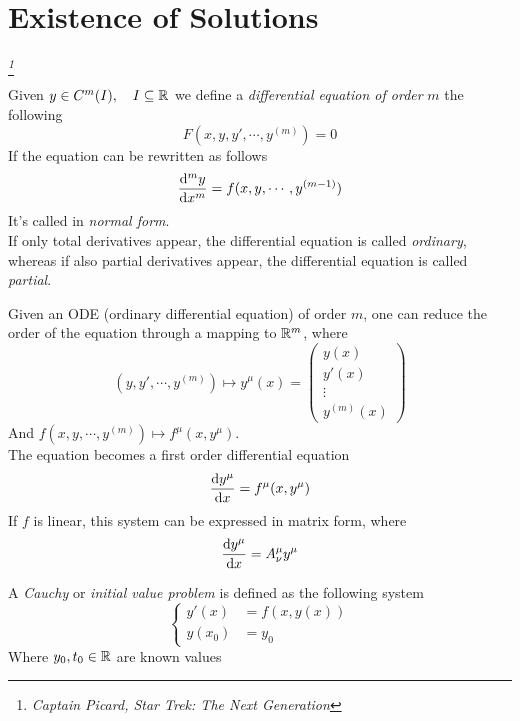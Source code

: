 \documentclass[../complete.tex]{subfiles}
\begin{document}
\section{Existence of Solutions}
\textit{\scalebox{0.7}{\bfseries You might test that assumption at your convenience}\footnote{\textit{Captain Picard, Star Trek: The Next Generation}}}
\baselineskip
\begin{dfn}
	Given $y\in C^m(I),\quad I\subseteq\mathbb{R}$ we define a \textit{differential equation of order} $m$ the following
	\begin{equation*}
		F(x,y,y',\cdots,y^{(m)})=0
	\end{equation*}
	If the equation can be rewritten as follows
	\begin{equation*}
		\derivative[m]{y}{x}=f(x,y,\cdots,y^{(m-1)})
	\end{equation*}
	It's called in \textit{normal form}.\\
	If only total derivatives appear, the differential equation is called \textit{ordinary}, whereas if also partial derivatives appear, the differential equation is called \textit{partial}.\\
\end{dfn}
\begin{thm}
	Given an ODE (ordinary differential equation) of order $m$, one can reduce the order of the equation through a mapping to $\mathbb{R}^m$, where
	\begin{equation*}
		(y,y',\cdots,y^{(m)})\mapsto y^\mu(x)=\begin{pmatrix}y(x)\\y'(x)\\\vdots\\y^{(m)}(x)\end{pmatrix}
	\end{equation*}
	And $f(x,y,\cdots,y^{(m)})\mapsto f^\mu(x,y^\mu)$.\\
	The equation becomes a first order differential equation
	\begin{equation*}
		\derivative{y^\mu}{x}=f^\mu(x,y^\mu)
	\end{equation*}
	If $f$ is linear, this system can be expressed in matrix form, where
	\begin{equation*}
		\derivative{y^\mu}{x}=A^\mu_\nu y^\mu
	\end{equation*}
\end{thm}
\begin{dfn}
	A \textit{Cauchy} or \textit{initial value problem} is defined as the following system
	\begin{equation}
		\left\{ \begin{aligned}
				y'(x)&=f(x,y(x))\\
				y(x_0)&=y_0
		\end{aligned}\right.
		\label{eq:cauchyprob}
	\end{equation}
	Where $y_0,t_0\in\mathbb{R}$ are known values
\end{dfn}
\end{document}
